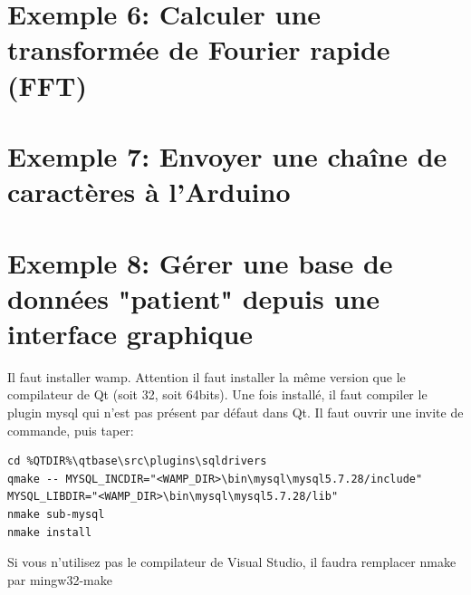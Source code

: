 \documentclass{article}
\begin{document}
\section{Exemple 6: Calculer une transformée de Fourier rapide (FFT)}


\section{Exemple 7:  Envoyer une chaîne de caractères à l'Arduino}

\section{Exemple 8:  Gérer une base de données "patient" depuis une interface graphique}

Il faut installer wamp. Attention il faut installer la même version que le compilateur de Qt (soit 32, soit 64bits).
Une fois installé, il faut compiler le plugin mysql qui n'est pas présent par défaut dans Qt. 
Il faut ouvrir une invite de commande, puis taper:
\begin{lstlisting}
cd %QTDIR%\qtbase\src\plugins\sqldrivers
qmake -- MYSQL_INCDIR="<WAMP_DIR>\bin\mysql\mysql5.7.28/include" 
MYSQL_LIBDIR="<WAMP_DIR>\bin\mysql\mysql5.7.28/lib"
nmake sub-mysql
nmake install
\end{lstlisting}
Si vous n'utilisez pas le compilateur de Visual Studio, il faudra remplacer nmake par mingw32-make
\end{document}
